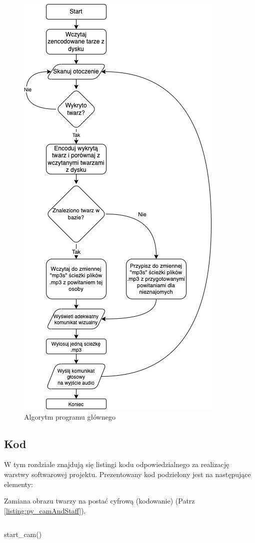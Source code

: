 \documentclass[a4paper,12pt,reqno]{article}
\begin{document}
\begin{figure}[H]%
\centering
\includegraphics[width=0.7\columnwidth]{imgs/glowny.drawio.jpg}
\caption{Algorytm programu głównego \label{algorytm_start_recognition}}
\quad
\end{figure}

\subsection{Kod}
W tym rozdziale znajdują się listingi kodu odpowiedzialnego za realizację warstwy softwarowej projektu.
Prezentowany kod podzielony jest na następujące elementy:\newline

Zamiana obrazu twarzy na postać cyfrową (kodowanie) (Patrz \ref{listing:py_camAndStaff}).
\begin{listing}[H]%
\begin{mdframed}[backgroundcolor=codebg]
\inputminted{python}{code/start_cam.py}
\end{mdframed}
\caption{start\_cam()}
\label{listing:py_camAndStaff}
\end{listing}
\end{document}
